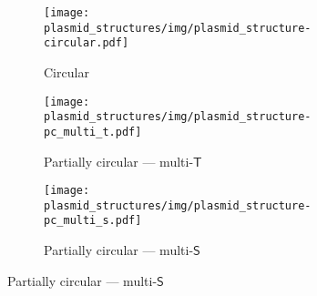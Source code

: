 \begin{figure}
  \centering
  \begin{subfigure}{0.3\linewidth}
    \centering
    \texttt{[image: plasmid\_structures/img/plasmid\_structure-circular.pdf]}
    \caption{Circular}%
    \label{subfig:plasmid_structure:circular}
  \end{subfigure}
  \hfill
  \begin{subfigure}{0.3\linewidth}
    \centering
    \texttt{[image: plasmid\_structures/img/plasmid\_structure-pc\_multi\_t.pdf]}
    \caption{Partially circular --- multi-\(\mathsf{T}\)}%
    \label{subfig:plasmid_structure:pc_multi_t}
  \end{subfigure}
  \hfill
  \begin{subfigure}{0.3\linewidth}
    \centering
    \texttt{[image: plasmid\_structures/img/plasmid\_structure-pc\_multi\_s.pdf]}
    \caption{Partially circular --- multi-\(\mathsf{S}\)}%
    \label{subfig:plasmid_structure:pc_multi_s}
  \end{subfigure}


\end{figure}
